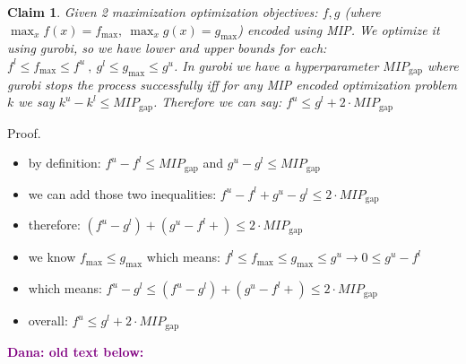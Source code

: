 \documentclass[11pt]{article}
\newcommand{\Dana}[1]{\textcolor{purple}{\bf Dana: #1}}
\newtheorem{claim}{Claim}
\begin{document}
 
  \begin{claim}\label{claim:BoundriesForVhagar}
Given 2 maximization optimization objectives: $f,g$ (where $\max_x {f(x)}=f_\text{max},\ \max_x {g(x)}=g_\text{max}$) encoded using MIP. We optimize it using gurobi, so we have lower and upper bounds for each: $f^l \leq f_\text{max} \leq f^u\ ,\ g^l \leq g_\text{max} \leq g^u$. In gurobi we have a hyperparameter $MIP_\text{gap}$ where gurobi stops the process successfully iff for any MIP encoded optimization problem $k$ we say $k^u-k^l \leq MIP_\text{gap}$. Therefore we can say: $f^u\leq g^l+2\cdot MIP_\text{gap}$
 \end{claim}
 Proof. \begin{itemize}
   \item  by definition: $f^u-f^l \leq MIP_\text{gap}$ and $g^u-g^l \leq MIP_\text{gap}$
   \item we can add those two inequalities: $f^u-f^l+g^u-g^l \leq 2\cdot MIP_\text{gap}$
   \item therefore: $(f^u-g^l)+(g^u-f^l+) \leq 2\cdot MIP_\text{gap}$
   \item we know $f_\text{max} \leq g_\text{max}$ which means: $f^l \leq f_\text{max} \leq g_\text{max} \leq g^u \rightarrow 0 \leq g^u- f^l$
   \item which means: $f^u-g^l \leq (f^u-g^l)+(g^u-f^l+) \leq 2\cdot MIP_\text{gap}$
   \item overall: $f^u\leq g^l+2\cdot MIP_\text{gap}$

 \end{itemize}
 
 
 


   \Dana{old text below:}
   
\end{document}
